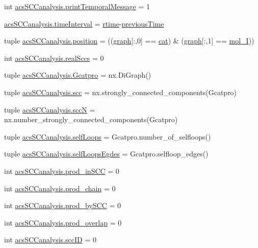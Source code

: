 \begin{DoxyCompactItemize}
\item 
int \hyperlink{a00128_a3de1ee32e24403b152d565d8c52cf7fd}{acs\-S\-C\-Canalysis.\-print\-Temporal\-Message} = 1
\item 
\hyperlink{a00128_a7d0f86310c439e970e0b41121364027c}{acs\-S\-C\-Canalysis.\-time\-Interval} = \hyperlink{a00028_afc6b38657a313b9f1de2ee356910b6ee}{rtime}-\/\hyperlink{a00028_a17b8652a085b5add031a40fb1c9a680e}{previous\-Time}
\item 
tuple \hyperlink{a00128_ac09e85f8df5b7c8c7d2caf87e9193421}{acs\-S\-C\-Canalysis.\-position} = ((\hyperlink{a00028_a2745e24fec2a44d51f4452beb1596bd3}{graph}\mbox{[}\-:,0\mbox{]} == \hyperlink{a00028_a7073f71a43389f3032e69b1fffc2551a}{cat}) \& (\hyperlink{a00028_a2745e24fec2a44d51f4452beb1596bd3}{graph}\mbox{[}\-:,1\mbox{]} == \hyperlink{a00028_ab346189eef5359a07ba32144ddcd4465}{mol\-\_\-\-I}))
\item 
int \hyperlink{a00128_ac6aaa0ac5d13b0736ab3179dc1ed388d}{acs\-S\-C\-Canalysis.\-real\-Sccs} = 0
\item 
tuple \hyperlink{a00128_ad88c3dd8eb89ddbe8720462b03f35003}{acs\-S\-C\-Canalysis.\-Gcatpro} = nx.\-Di\-Graph()
\item 
tuple \hyperlink{a00128_a2094b7f0917a16a948a2d1c4d700e84c}{acs\-S\-C\-Canalysis.\-scc} = nx.\-strongly\-\_\-connected\-\_\-components(Gcatpro)
\item 
tuple \hyperlink{a00128_a185cbf8ef1ec67f52695562582418793}{acs\-S\-C\-Canalysis.\-scc\-N} = nx.\-number\-\_\-strongly\-\_\-connected\-\_\-components(Gcatpro)
\item 
tuple \hyperlink{a00128_a8fec45ae9b70981ce94eaeed14d888b1}{acs\-S\-C\-Canalysis.\-self\-Loops} = Gcatpro.\-number\-\_\-of\-\_\-selfloops()
\item 
tuple \hyperlink{a00128_ad34596e89eef2cfb696f61a810765c7a}{acs\-S\-C\-Canalysis.\-self\-Loops\-Egdes} = Gcatpro.\-selfloop\-\_\-edges()
\item 
int \hyperlink{a00128_adbc76b0558ceb74d798b35146a583474}{acs\-S\-C\-Canalysis.\-prod\-\_\-in\-S\-C\-C} = 0
\item 
int \hyperlink{a00128_ab307c6047e4d16ec0335266b24e7db5a}{acs\-S\-C\-Canalysis.\-prod\-\_\-chain} = 0
\item 
int \hyperlink{a00128_abb2ac92624837ae48b882d145c5aab11}{acs\-S\-C\-Canalysis.\-prod\-\_\-by\-S\-C\-C} = 0
\item 
int \hyperlink{a00128_a213e964195f0666d00663ca874a09caa}{acs\-S\-C\-Canalysis.\-prod\-\_\-overlap} = 0
\item 
int \hyperlink{a00128_a1dd3c43841ba4485a66889600f099a0c}{acs\-S\-C\-Canalysis.\-scc\-I\-D} = 0

\end{DoxyCompactItemize}
